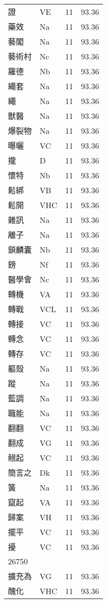 \documentclass[twocolumn]{book}
\begin{document}
\begin{supertabular}{llrr}
證 & VE & 11 &  93.36\\
藥效 & Na & 11 &  93.36\\
藝閣 & Na & 11 &  93.36\\
藝術村 & Nc & 11 &  93.36\\
羅德 & Nb & 11 &  93.36\\
繩套 & Na & 11 &  93.36\\
繩 & Na & 11 &  93.36\\
獸醫 & Na & 11 &  93.36\\
爆裂物 & Na & 11 &  93.36\\
曝曬 & VC & 11 &  93.36\\
攏 & D & 11 &  93.36\\
懷特 & Nb & 11 &  93.36\\
鬆綁 & VB & 11 &  93.36\\
鬆開 & VHC & 11 &  93.36\\
雜訊 & Na & 11 &  93.36\\
離子 & Na & 11 &  93.36\\
鎖麟囊 & Nb & 11 &  93.36\\
鎊 & Nf & 11 &  93.36\\
醫學會 & Nc & 11 &  93.36\\
轉機 & VA & 11 &  93.36\\
轉戰 & VCL & 11 &  93.36\\
轉接 & VC & 11 &  93.36\\
轉念 & VC & 11 &  93.36\\
轉存 & VC & 11 &  93.36\\
軀殼 & Na & 11 &  93.36\\
蹤 & Na & 11 &  93.36\\
藍調 & Na & 11 &  93.36\\
職能 & Na & 11 &  93.36\\
翻翻 & VC & 11 &  93.36\\
翻成 & VG & 11 &  93.36\\
翹起 & VC & 11 &  93.36\\
簡言之 & Dk & 11 &  93.36\\
簧 & Na & 11 &  93.36\\
竄起 & VA & 11 &  93.36\\
歸案 & VH & 11 &  93.36\\
擺平 & VC & 11 &  93.36\\
擾 & VC & 11 &  93.36\\
26750\\
擴充為 & VG & 11 &  93.36\\
醜化 & VHC & 11 &  93.36\\

\end{supertabular}
\end{document}
